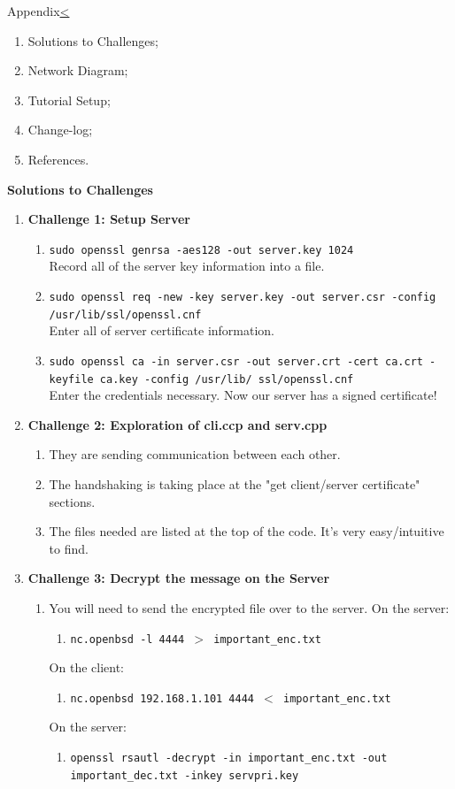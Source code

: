 \documentclass[12pt]{extarticle}
\newenvironment{instructionblock}{\Large\bgroup}{\egroup}
\newcommand{\ben}{\begin{enumerate}}
\newcommand{\een}{\end{enumerate}}
\begin{document}
\pagebreak
\begin{slide}{Appendix}{\hyperref[slide 20]{\textless}}
	\begin{instructionblock}
		\ben
			\item Solutions to Challenges;
			\item Network Diagram;
			\item Tutorial Setup;
			\item Change-log;
			\item References.
		\een
	\end{instructionblock}
\end{slide}

\pagebreak
\Large{\textbf{Solutions to Challenges}}\\
\normalsize
\ben
	\item \textbf{Challenge 1: Setup Server}
		\ben
			\item \texttt{sudo openssl genrsa -aes128 -out server.key 1024} \\
			Record all of the server key information into a file.
			\item \texttt{sudo openssl req -new -key server.key -out server.csr -config /usr/lib/ssl/openssl.cnf} \\
			Enter all of server certificate information.
			\item  \texttt{sudo openssl ca -in server.csr -out server.crt -cert ca.crt -keyfile ca.key -config /usr/lib/						ssl/openssl.cnf} \\
			Enter the credentials necessary. Now our server has a signed certificate!
		\een
	\item \textbf{Challenge 2: Exploration of cli.ccp and serv.cpp}
		\ben
			\item They are sending communication between each other.
			\item The handshaking is taking place at the "get client/server certificate" sections.
			\item The files needed are listed at the top of the code. It's very easy/intuitive to find.
		\een
	\item \textbf{Challenge 3: Decrypt the message on the Server}
		\ben
			\item You will need to send the encrypted file over to the server.
			On the server:
			\ben
				\item \texttt{nc.openbsd -l 4444 $>$ important\_enc.txt}
			\een
			On the client:
			\ben
				\item \texttt{nc.openbsd 192.168.1.101 4444 $<$ important\_enc.txt}
			\een
			On the server:
			\ben
				\item \texttt{openssl rsautl -decrypt -in important\_enc.txt -out\\ important\_dec.txt -inkey servpri.key}
			\een
		\een
\een
\end{document}
